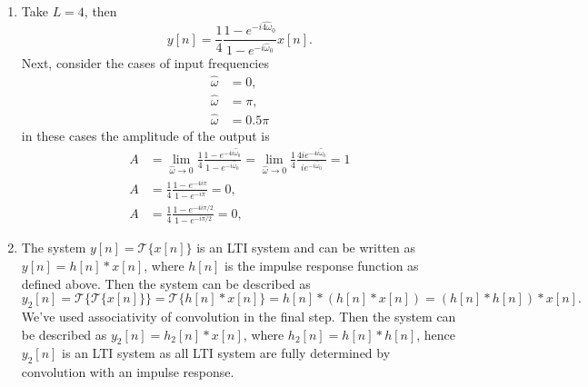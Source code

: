 \begin{enumerate}
\item Take $L=4$, then
$$y[n]=\frac{1}{4}\frac{1-e^{-i\hat{4\omega}_{0}}}{1-e^{-i\hat{\omega}_{0}}}x[n].$$
Next, consider the cases of input frequencies
\begin{align*}
    \hat{\omega}&=0,\\
    \hat{\omega}&=\pi,\\
    \hat{\omega}&=0.5\pi
\end{align*}
in these cases the amplitude of the output is
\begin{align*}
    A&=\lim_{\hat{\omega}\to 0}\frac{1}{4}\frac{1-e^{-4i\hat{\omega}_{0}}}{1-e^{-i\hat{\omega}_{0}}}=\lim_{\hat{\omega}\to 0}\frac{1}{4}\frac{4ie^{-4i\hat{\omega}_{0}}}{ie^{-i\hat{\omega}_{0}}}=1 \\
    A&=\frac{1}{4}\frac{1-e^{-4i\pi}}{1-e^{-i\pi}}=0,\\
    A&=\frac{1}{4}\frac{1-e^{-4i\pi/2}}{1-e^{-i\pi/2}}=0,
\end{align*}

\item The system $y[n]=\mathcal{T}\{x[n]\}$ is an LTI system and can be written as $y[n]=h[n]*x[n]$, where $h[n]$ is the impulse response function as defined above. Then the system can be described as
$$y_{2}[n]=\mathcal{T}\{\mathcal{T}\{x[n]\}\}=\mathcal{T}\{h[n]*x[n]\}=h[n]*(h[n]*x[n])=(h[n]*h[n])*x[n].$$
We've used associativity of convolution in the final step. Then the system can be described as $y_{2}[n]=h_{2}[n]*x[n]$, where $h_{2}[n]=h[n]*h[n]$, hence $y_{2}[n]$ is an LTI system as all LTI system are fully determined by convolution with an impulse response. 


\end{enumerate}
